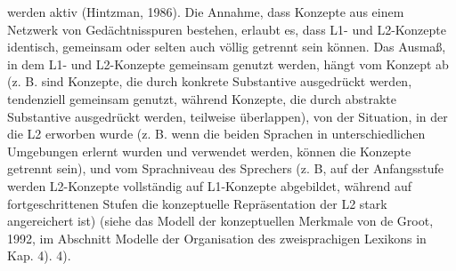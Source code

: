 \documentclass[
  letterpaper,
]{scrbook}
\begin{document}
werden aktiv (Hintzman, 1986). Die Annahme, dass Konzepte aus einem
Netzwerk von Gedächtnisspuren bestehen, erlaubt es, dass L1- und
L2-Konzepte identisch, gemeinsam oder selten auch völlig getrennt sein
können. Das Ausmaß, in dem L1- und L2-Konzepte gemeinsam genutzt werden,
hängt vom Konzept ab (z. B. sind Konzepte, die durch konkrete
Substantive ausgedrückt werden, tendenziell gemeinsam genutzt, während
Konzepte, die durch abstrakte Substantive ausgedrückt werden, teilweise
überlappen), von der Situation, in der die L2 erworben wurde (z. B. wenn
die beiden Sprachen in unterschiedlichen Umgebungen erlernt wurden und
verwendet werden, können die Konzepte getrennt sein), und vom
Sprachniveau des Sprechers (z. B, auf der Anfangsstufe werden
L2-Konzepte vollständig auf L1-Konzepte abgebildet, während auf
fortgeschrittenen Stufen die konzeptuelle Repräsentation der L2 stark
angereichert ist) (siehe das Modell der konzeptuellen Merkmale von de
Groot, 1992, im Abschnitt Modelle der Organisation des zweisprachigen
Lexikons in Kap. 4). 4).
\end{document}
